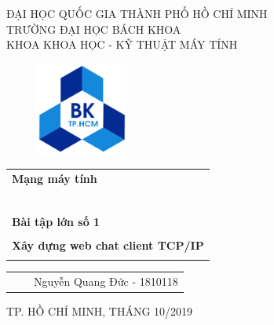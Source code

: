 \documentclass[a4paper]{article}
\begin{document}
\begin{titlepage}
\begin{center}
ĐẠI HỌC QUỐC GIA THÀNH PHỐ HỒ CHÍ MINH \\
TRƯỜNG ĐẠI HỌC BÁCH KHOA \\
KHOA KHOA HỌC - KỸ THUẬT MÁY TÍNH 
\end{center}

\vspace{1cm}

\begin{figure}[h!]
\begin{center}
\includegraphics[width=3cm]{hcmut.png}
\end{center}
\end{figure}

\vspace{1cm}


\begin{center}
\begin{tabular}{c}
\multicolumn{1}{l}{\textbf{{\Large Mạng máy tính}}}\\
~~\\
\hline

\\
\multicolumn{1}{l}{\textbf{{\Large Bài tập lớn số 1}}}\\
\\
\textbf{{\Huge Xây dựng web chat client TCP/IP}}\\
\\
\hline
\end{tabular}
\end{center}

\vspace{3cm}

\begin{table}[h]
\begin{tabular}{rrl}
& & Nguyễn Quang Đức - 1810118 \\
\end{tabular}
\end{table}

\begin{center}
{\footnotesize TP. HỒ CHÍ MINH, THÁNG 10/2019}
\end{center}
\end{titlepage}
\end{document}
